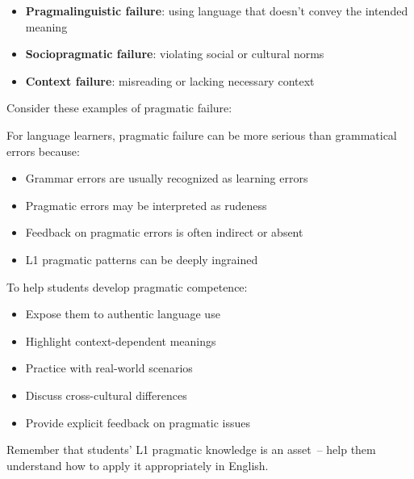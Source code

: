 \begin{itemize}
    \item \textbf{Pragmalinguistic failure}: using language that doesn't convey the intended meaning
    \item \textbf{Sociopragmatic failure}: violating social or cultural norms
    \item \textbf{Context failure}: misreading or lacking necessary context
\end{itemize}

Consider these examples of pragmatic failure:
\ea
    \z
\z

For language learners, pragmatic failure can be more serious than grammatical errors because:
\begin{itemize}
    \item Grammar errors are usually recognized as learning errors
    \item Pragmatic errors may be interpreted as rudeness
    \item Feedback on pragmatic errors is often indirect or absent
    \item L1 pragmatic patterns can be deeply ingrained
\end{itemize}

\begin{tcolorbox}[title=Teaching Pragmatic Competence, colback=white]
To help students develop pragmatic competence:
\begin{itemize}
    \item Expose them to authentic language use
    \item Highlight context-dependent meanings
    \item Practice with real-world scenarios
    \item Discuss cross-cultural differences
    \item Provide explicit feedback on pragmatic issues
\end{itemize}
Remember that students' L1 pragmatic knowledge is an asset~-- help them understand how to apply it appropriately in English.
\end{tcolorbox}